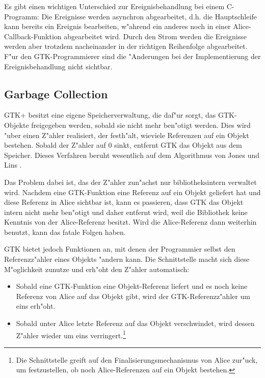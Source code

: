 \documentclass[a4paper,titlepage]{article}
\begin{document}
Es gibt einen wichtigen Unterschied
zur Ereignisbehandlung bei einem C-Programm: Die Ereignisse werden asynchron
abgearbeitet, d.h. die Hauptschleife kann bereits ein Ereignis bearbeiten,
w"ahrend ein anderes noch in einer Alice-Callback-Funktion abgearbeitet wird.
Durch den Strom werden die Ereignisse werden aber trotzdem nacheinander
in der richtigen Reihenfolge abgearbeitet. F"ur den GTK-Programmierer sind
die "Anderungen bei der Implementierung der Ereignisbehandlung nicht sichtbar.

\subsection{Garbage Collection}

GTK+ besitzt eine eigene Speicherverwaltung, die daf"ur sorgt,
das GTK-Objekte freigegeben werden, sobald sie nicht mehr ben"otigt werden.
Dies wird "uber einen Z"ahler realisiert, der festh"alt, wieviele
Referenzen auf ein Objekt bestehen. Sobald der Z"ahler auf 0 sinkt,
entfernt GTK das Objekt aus dem Speicher.
Dieses Verfahren beruht wesentlich auf dem Algorithmus von
Jones und Lins \cite{jones}.

Das Problem dabei ist, das der Z"ahler zun"achst nur bibliotheksintern
verwaltet wird. Nachdem eine GTK-Funktion eine Referenz
auf ein Objekt geliefert hat und diese Referenz in Alice sichtbar ist,
kann es passieren, dass GTK das Objekt intern nicht mehr ben"otigt und
daher entfernt wird, weil die Bibliothek keine Kenntnis von der Alice-Referenz
besitzt. Wird die Alice-Referenz dann weiterhin benutzt, kann das fatale
Folgen haben.

GTK bietet jedoch Funktionen an, mit denen der Programmier selbst 
den Referenzz"ahler eines Objekts "andern kann. Die Schnittstelle macht
sich diese M"oglichkeit zunutze und erh"oht den Z"ahler automatisch:

\begin{itemize}
\item Sobald eine GTK-Funktion eine Objekt-Referenz liefert und es noch keine
      Referenz von Alice auf das Objekt gibt, wird der GTK-Referenzz"ahler
      um eins erh"oht.
\item Sobald unter Alice letzte Referenz auf das Objekt verschwindet, wird
      dessen Z"ahler wieder um eins verringert.\footnote{Die Schnittstelle 
      greift auf den Finalisierungsmechanismus von Alice zur"uck,
      um festzustellen, ob noch Alice-Referenzen auf ein Objekt bestehen.}
\end{itemize}
\end{document}
